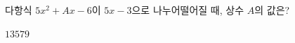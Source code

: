 다항식 $5x^2+Ax-6$이 $5x-3$으로 나누어떨어질 때, 상수 $A$의 값은?
\begin{choices32}{$1$}{$3$}{$5$}{$7$}{$9$}\end{choices32}
